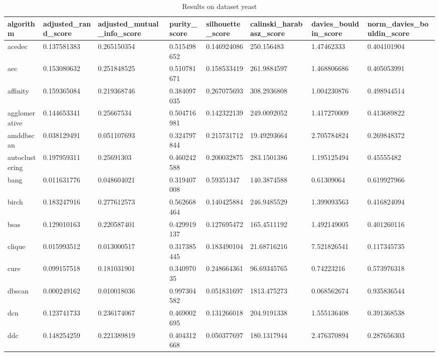 \begin{table}[H]
\centering
\caption{Results on dataset yeast}
\label{tab:params:yeast}
\begin{tabular}{|l|l|l|l|l|l|l|l|}
\hline
algorithm & adjusted\_rand\_score & adjusted\_mutual\_info\_score & purity\_score & silhouette\_score & calinski\_harabasz\_score & davies\_bouldin\_score & norm\_davies\_bouldin\_score \\
\hline
acedec & 0.137581383 & 0.265150354 & 0.515498652 & 0.146924086 & 250.156483 & 1.47462333 & 0.404101904 \\
\hline
aec & 0.153080632 & 0.251848525 & 0.510781671 & 0.158533419 & 261.9884597 & 1.468806686 & 0.405053991 \\
\hline
affinity & 0.159365084 & 0.219368746 & 0.384097035 & 0.267075693 & 308.2936808 & 1.004230876 & 0.498944514 \\
\hline
agglomerative & 0.144653341 & 0.25667534 & 0.504716981 & 0.142322139 & 249.0092052 & 1.417270009 & 0.413689822 \\
\hline
amddbscan & 0.038129491 & 0.051107693 & 0.324797844 & 0.215731712 & 19.49293664 & 2.705784824 & 0.269848372 \\
\hline
autoclustering & 0.197959311 & 0.25691303 & 0.460242588 & 0.200032875 & 283.1501386 & 1.195125494 & 0.45555482 \\
\hline
bang & 0.011631776 & 0.048604021 & 0.319407008 & 0.59351347 & 140.3874588 & 0.61309064 & 0.619927966 \\
\hline
birch & 0.183247916 & 0.277612573 & 0.562668464 & 0.140425884 & 246.9485529 & 1.399093563 & 0.416824094 \\
\hline
bsas & 0.129010163 & 0.220587401 & 0.429919137 & 0.127695472 & 165.4511192 & 1.492149005 & 0.401260116 \\
\hline
clique & 0.015993512 & 0.013000517 & 0.317385445 & 0.183490104 & 21.68716216 & 7.521826541 & 0.117345735 \\
\hline
cure & 0.099157518 & 0.181031901 & 0.34097035 & 0.248664361 & 96.69345765 & 0.74223216 & 0.573976318 \\
\hline
dbscan & 0.000249162 & 0.010018036 & 0.997304582 & 0.051831697 & 1813.475273 & 0.068562674 & 0.935836544 \\
\hline
dcn & 0.123741733 & 0.236174067 & 0.469002695 & 0.131266018 & 204.9191338 & 1.555136408 & 0.391368538 \\
\hline
ddc & 0.148254259 & 0.221389819 & 0.404312668 & 0.050377697 & 180.1317944 & 2.476370894 & 0.287656303 \\

\end{tabular}
\end{table}
